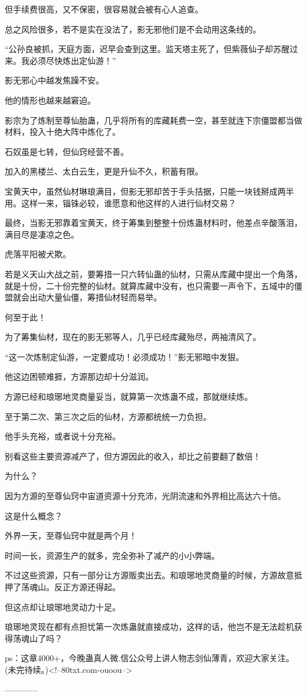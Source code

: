 \begin{this_body}
但手续费很高，又不保密，很容易就会被有心人追查。

总之风险很多，若不是实在没法了，影无邪他们是不会动用这条线的。

“公孙良被抓，天庭方面，迟早会查到这里。监天塔主死了，但紫薇仙子却苏醒过来。我必须尽快炼出定仙游！”

影无邪心中越发焦躁不安。

他的情形也越来越窘迫。

影宗为了炼制至尊仙胎蛊，几乎将所有的库藏耗费一空，甚至就连下宗僵盟都当做材料，投入十绝大阵中炼化了。

石奴虽是七转，但仙窍经营不善。

加入的黑楼兰、太白云生，更是升仙不久，积蓄有限。

宝黄天中，虽然仙材琳琅满目，但影无邪却苦于手头拮据，只能一块钱掰成两半用。这样一来，锱铢必较，谁愿意和他这样的人进行仙材交易？

最终，当影无邪靠着宝黄天，终于筹集到整整十份炼蛊材料时，他差点辛酸落泪，满目尽是凄凉之色。

虎落平阳被犬欺。

若是义天山大战之前，要筹措一只六转仙蛊的仙材，只需从库藏中提出一个角落，就是十份，二十份完整的仙材。就算库藏中没有，也只需要一声令下，五域中的僵盟就会出动大量仙僵，筹措仙材轻而易举。

何至于此！

为了筹集仙材，现在的影无邪等人，几乎已经库藏殆尽，两袖清风了。

“这一次炼制定仙游，一定要成功！必须成功！”影无邪暗中发狠。

他这边困顿难捱，方源那边却十分滋润。

方源已经和琅琊地灵商量妥当，就算第一次炼蛊不成，那就继续炼。

至于第二次、第三次之后的仙材，方源都统统一力负担。

他手头充裕，或者说十分充裕。

别看这些主要资源减产了，但方源因此的收入，却比之前要翻了数倍！

为什么？

因为方源的至尊仙窍中宙道资源十分充沛，光阴流速和外界相比高达六十倍。

这是什么概念？

外界一天，至尊仙窍中就是两个月！

时间一长，资源生产的就多，完全弥补了减产的小小弊端。

不过这些资源，只有一部分让方源贩卖出去。和琅琊地灵商量的时候，方源故意抵押了荡魂山。反正方源还得起。

但这点却让琅琊地灵动力十足。

琅琊地灵现在都有点担忧第一次炼蛊就直接成功，这样的话，他岂不是无法趁机获得荡魂山了吗？

ps：这章4000+，今晚蛊真人微.信公众号上讲人物志剑仙薄青，欢迎大家关注。(未完待续。)<!--80txt.com-ouoou-->

------------

\end{this_body}

